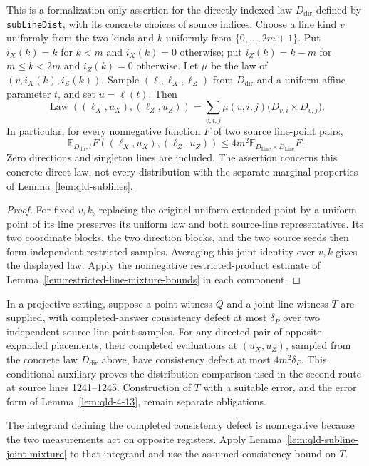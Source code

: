 \begin{lemma}
\label{lem:qld-subline-joint-mixture}
\leanok
{}
This is a formalization-only assertion for the directly indexed law
$D_{\mathrm{dir}}$ defined by \texttt{subLineDist}, with its concrete choices
of source indices. Choose a line kind $v$ uniformly from the two kinds and
$k$ uniformly from $\{0,\ldots,2m+1\}$. Put $i_X(k)=k$ for $k<m$ and
$i_X(k)=0$ otherwise; put $i_Z(k)=k-m$ for $m\leq k<2m$ and $i_Z(k)=0$
otherwise. Let $\mu$ be the law of $(v,i_X(k),i_Z(k))$.
Sample $(\ell,\ell_X,\ell_Z)$ from $D_{\mathrm{dir}}$ and a uniform affine
parameter $t$, and set $u=\ell(t)$. Then
\[
 \operatorname{Law}((\ell_X,u_X),(\ell_Z,u_Z))
 =\sum_{v,i,j}\mu(v,i,j)\bigl(D_{v,i}\times D_{v,j}\bigr).
\]
In particular, for every nonnegative function $F$ of two source line-point
pairs,
\[
 \mathbb{E}_{D_{\mathrm{dir}},t}F((\ell_X,u_X),(\ell_Z,u_Z))
 \leq 4m^2\mathbb{E}_{D_{\mathrm{Line}}\times D_{\mathrm{Line}}}F.
\]
Zero directions and singleton lines are included. The assertion concerns
this concrete direct law, not every distribution with the separate marginal
properties of Lemma~\ref{lem:qld-sublines}.
\end{lemma}
\begin{proof}
\leanok
For fixed $v,k$, replacing the original uniform extended point by a uniform
point of its line preserves its uniform law and both source-line
representatives. Its two coordinate blocks, the two direction blocks, and
the two source seeds then form independent restricted samples. Averaging
this joint identity over $v,k$ gives the displayed law. Apply the
nonnegative restricted-product estimate of
Lemma~\ref{lem:restricted-line-mixture-bounds} in each component.
\end{proof}

\begin{remark}
\label{rem:qld-subline-joint-consistency}
In a projective setting, suppose a point witness $Q$ and a joint line
witness $T$ are supplied, with completed-answer consistency defect at most
$\delta_P$ over two independent source line-point samples. For any directed
pair of opposite expanded placements, their completed evaluations at
$(u_X,u_Z)$, sampled from the concrete law $D_{\mathrm{dir}}$ above, have
consistency defect at most $4m^2\delta_P$.
This conditional auxiliary proves the distribution comparison used in the
second route at source lines 1241--1245. Construction of $T$ with a suitable
error, and the error form of Lemma~\ref{lem:qld-4-13}, remain separate
obligations.

The integrand defining the completed consistency defect is nonnegative
because the two measurements act on opposite registers. Apply
Lemma~\ref{lem:qld-subline-joint-mixture} to that integrand and use the
assumed consistency bound on $T$.
\end{remark}

